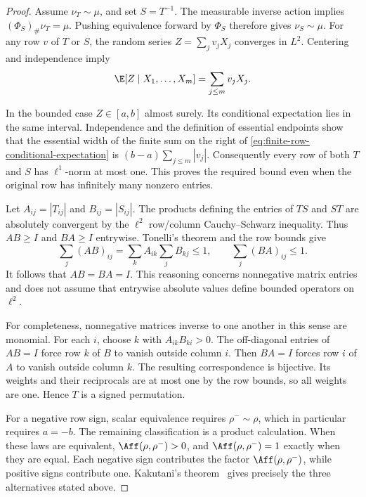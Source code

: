 \begin{proof}
Assume \(\nu_T\sim\mu\), and set \(S=T^{-1}\).
The measurable inverse action implies
\((\Phi_S)_\#\nu_T=\mu\).
Pushing equivalence forward by \(\Phi_S\) therefore gives
\(\nu_S\sim\mu\).
For any row \(v\) of \(T\) or \(S\), the random series
\(Z=\sum_jv_jX_j\) converges in \(L^2\).
Centering and independence imply
\begin{equation}
 \E[Z\mid X_1,\ldots,X_m]=\sum_{j\leq m}v_jX_j.
 \label{eq:finite-row-conditional-expectation}
\end{equation}

In the bounded case \(Z\in[a,b]\) almost surely.
Its conditional expectation lies in the same interval.
Independence and the definition of essential endpoints show that
the essential width of the finite sum on the right of
\eqref{eq:finite-row-conditional-expectation} is
\((b-a)\sum_{j\leq m}|v_j|\).
Consequently every row of both \(T\) and \(S\) has
\(\ell^1\)-norm at most one.
This proves the required bound even when the original row has
infinitely many nonzero entries.

Let \(A_{ij}=|T_{ij}|\) and \(B_{ij}=|S_{ij}|\).
The products defining the entries of \(TS\) and \(ST\) are absolutely
convergent by the \(\ell^2\) row/column Cauchy--Schwarz inequality.
Thus \(AB\geq I\) and \(BA\geq I\) entrywise.
Tonelli's theorem and the row bounds give
\[
 \sum_j(AB)_{ij}
 =\sum_k A_{ik}\sum_jB_{kj}\leq1,
 \qquad
 \sum_j(BA)_{ij}\leq1.
\]
It follows that \(AB=BA=I\).
This reasoning concerns nonnegative matrix entries and does not
assume that entrywise absolute values define bounded operators
on \(\ell^2\).

For completeness, nonnegative matrices inverse to one another in
this sense are monomial.
For each \(i\), choose \(k\) with \(A_{ik}B_{ki}>0\).
The off-diagonal entries of \(AB=I\) force row \(k\) of \(B\)
to vanish outside column \(i\).
Then \(BA=I\) forces row \(i\) of \(A\) to vanish outside column \(k\).
The resulting correspondence is bijective.
Its weights and their reciprocals are at most one by the row bounds,
so all weights are one.
Hence \(T\) is a signed permutation.

For a negative row sign, scalar equivalence requires
\(\rho^-\sim\rho\), which in particular requires \(a=-b\).
The remaining classification is a product calculation.
When these laws are equivalent, \(\Aff(\rho,\rho^-)>0\), and
\(\Aff(\rho,\rho^-)=1\) exactly when they are equal.  Each negative sign contributes the factor
\(\Aff(\rho,\rho^-)\), while positive signs contribute one.
Kakutani's theorem~\cite{kakutani1948equivalence} gives precisely
the three alternatives stated above.


\end{proof}
